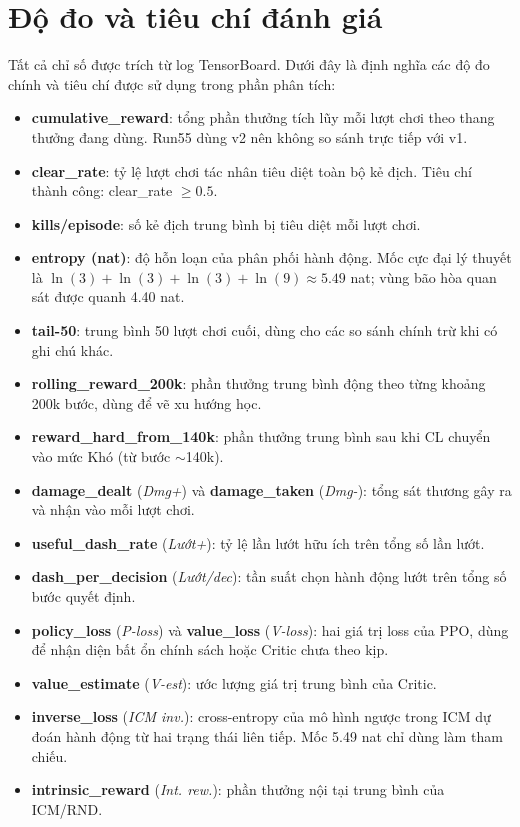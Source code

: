 \section{Độ đo và tiêu chí đánh giá}
\label{sec:eval_metrics}

Tất cả chỉ số được trích từ log TensorBoard. Dưới đây là định nghĩa các độ đo chính và tiêu chí được sử dụng trong phần phân tích:

\begin{itemize}
    \item \textbf{cumulative\_reward}: tổng phần thưởng tích lũy mỗi lượt chơi theo thang thưởng đang dùng. Run55 dùng v2 nên không so sánh trực tiếp với v1.
    \item \textbf{clear\_rate}: tỷ lệ lượt chơi tác nhân tiêu diệt toàn bộ kẻ địch. Tiêu chí thành công: clear\_rate $\geq 0.5$.
    \item \textbf{kills/episode}: số kẻ địch trung bình bị tiêu diệt mỗi lượt chơi.
    \item \textbf{entropy (nat)}: độ hỗn loạn của phân phối hành động. Mốc cực đại lý thuyết là $\ln(3)+\ln(3)+\ln(3)+\ln(9) \approx 5.49$ nat; vùng bão hòa quan sát được quanh 4.40 nat.
    \item \textbf{tail-50}: trung bình 50 lượt chơi cuối, dùng cho các so sánh chính trừ khi có ghi chú khác.
    \item \textbf{rolling\_reward\_200k}: phần thưởng trung bình động theo từng khoảng 200k bước, dùng để vẽ xu hướng học.
    \item \textbf{reward\_hard\_from\_140k}: phần thưởng trung bình sau khi CL chuyển vào mức Khó (từ bước $\sim$140k).
    \item \textbf{damage\_dealt} (\textit{Dmg+}) và \textbf{damage\_taken} (\textit{Dmg-}): tổng sát thương gây ra và nhận vào mỗi lượt chơi.
    \item \textbf{useful\_dash\_rate} (\textit{Lướt+}): tỷ lệ lần lướt hữu ích trên tổng số lần lướt.
    \item \textbf{dash\_per\_decision} (\textit{Lướt/dec}): tần suất chọn hành động lướt trên tổng số bước quyết định.
    \item \textbf{policy\_loss} (\textit{P-loss}) và \textbf{value\_loss} (\textit{V-loss}): hai giá trị loss của PPO, dùng để nhận diện bất ổn chính sách hoặc Critic chưa theo kịp.
    \item \textbf{value\_estimate} (\textit{V-est}): ước lượng giá trị trung bình của Critic.
    \item \textbf{inverse\_loss} (\textit{ICM inv.}): cross-entropy của mô hình ngược trong ICM dự đoán hành động từ hai trạng thái liên tiếp. Mốc 5.49 nat chỉ dùng làm tham chiếu.
    \item \textbf{intrinsic\_reward} (\textit{Int. rew.}): phần thưởng nội tại trung bình của ICM/RND.
\end{itemize}

